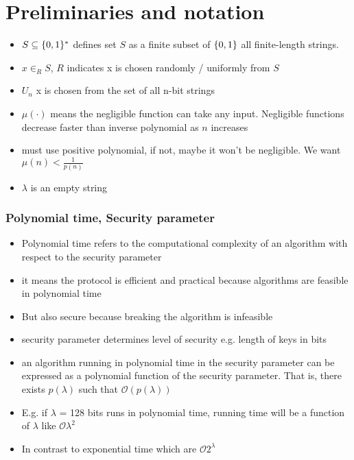 \section*{Preliminaries and notation}
\begin{itemize}
    \item $S \subseteq \{0,1\}^*$ defines set $S$ as a finite subset of $\{0,1\}$ all finite-length strings. 
    \item $x \in_R S$, $R$ indicates x is chosen randomly / uniformly from $S$
    \item $U_n$ x is chosen from the set of all n-bit strings
    \item $\mu(\cdot)$ means the negligible function can take any input. Negligible functions decrease faster than inverse polynomial as $n$ increases
    \item must use positive polynomial, if not, maybe it won't be negligible. We want $\mu(n) < \frac{1}{p(n)}$
    \item $\lambda$ is an empty string
\end{itemize}

\subsubsection*{Polynomial time, Security parameter}
\begin{itemize}
    \item Polynomial time refers to the computational complexity of an algorithm with respect to the security parameter
    \item it means the protocol is efficient and practical because algorithms are feasible in polynomial time
    \item But also secure because breaking the algorithm is infeasible
    \item security parameter determines level of security e.g. length of keys in bits
    \item an algorithm running in polynomial time in the security parameter can be expressed as a polynomial function of the security parameter. That is, there exists $ p(\lambda)$ such that $\mathcal{O}(p(\lambda))$
    \item E.g. if $\lambda$ = 128 bits runs in polynomial time, running time will be a function of $\lambda$ like $\mathcal{O}\lambda^2$
    \item In contrast to exponential time which are $\mathcal{O}2^{\lambda}$
\end{itemize}

